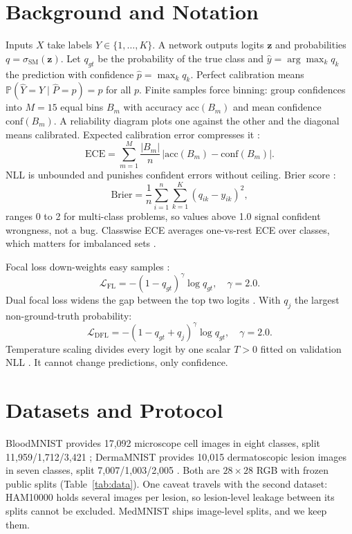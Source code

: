 \documentclass[a4paper,11pt,en,citestyle=authoryear,bibstyle=authoryear]{elegantpaper}
\begin{document}
\section{Background and Notation}
Inputs $X$ take labels $Y \in \{1, \dots, K\}$. A network outputs logits $\mathbf{z}$ and probabilities $q = \sigma_{\mathrm{SM}}(\mathbf{z})$. Let $q_{gt}$ be the probability of the true class and $\hat{y} = \arg\max_k q_k$ the prediction with confidence $\hat{p} = \max_k q_k$. Perfect calibration means $\mathbb{P}(\hat{Y}=Y \mid \hat{P}=p) = p$ for all $p$. Finite samples force binning: group confidences into $M=15$ equal bins $B_m$ with accuracy $\mathrm{acc}(B_m)$ and mean confidence $\mathrm{conf}(B_m)$. A reliability diagram plots one against the other and the diagonal means calibrated. Expected calibration error compresses it \parencite{naeini2015}:
\begin{equation}
\mathrm{ECE} = \sum_{m=1}^{M} \frac{|B_m|}{n}\,\bigl|\mathrm{acc}(B_m)-\mathrm{conf}(B_m)\bigr|.
\end{equation}
NLL is unbounded and punishes confident errors without ceiling. Brier score \parencite{brier1950}:
\begin{equation}
\mathrm{Brier} = \frac{1}{n}\sum_{i=1}^{n}\sum_{k=1}^{K}(q_{ik} - y_{ik})^2,
\end{equation}
ranges 0 to 2 for multi-class problems, so values above 1.0 signal confident wrongness, not a bug. Classwise ECE averages one-vs-rest ECE over classes, which matters for imbalanced sets \parencite{nixon2019}.

Focal loss down-weights easy samples \parencite{focal2020}:
\begin{equation}
\mathcal{L}_{\mathrm{FL}} = -(1-q_{gt})^\gamma \log q_{gt}, \quad \gamma = 2.0.
\end{equation}
Dual focal loss widens the gap between the top two logits \parencite{dualfocal2023}. With $q_j$ the largest non-ground-truth probability:
\begin{equation}
\mathcal{L}_{\mathrm{DFL}} = -(1 - q_{gt} + q_j)^\gamma \log q_{gt}, \quad \gamma = 2.0.
\end{equation}
Temperature scaling divides every logit by one scalar $T>0$ fitted on validation NLL \parencite{guo2017}. It cannot change predictions, only confidence.

\section{Datasets and Protocol}
BloodMNIST provides 17,092 microscope cell images in eight classes, split 11,959/1,712/3,421 \parencite{acevedo2020}; DermaMNIST provides 10,015 dermatoscopic lesion images in seven classes, split 7,007/1,003/2,005 \parencite{tschandl2018}. Both are $28\times28$ RGB with frozen public splits (Table~\ref{tab:data}). One caveat travels with the second dataset: HAM10000 holds several images per lesion, so lesion-level leakage between its splits cannot be excluded. MedMNIST ships image-level splits, and we keep them.
\end{document}
